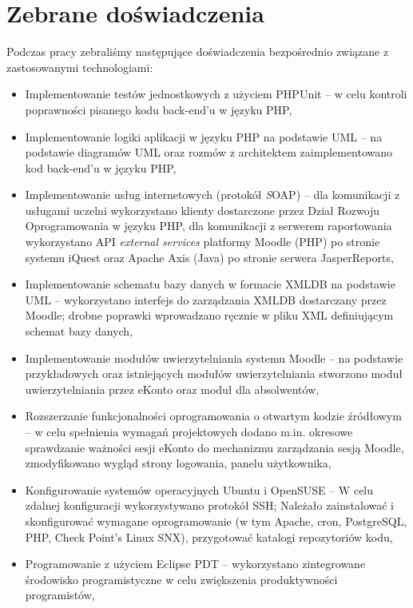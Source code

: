 \chapter{Zebrane doświadczenia}
\label{Chapter8}

Podczas pracy zebraliśmy następujące doświadczenia bezpośrednio związane z zastosowanymi technologiami:
\begin{itemize}
\item Implementowanie testów jednostkowych z użyciem PHPUnit -- w celu kontroli poprawności pisanego kodu back-end'u w języku PHP,
\item Implementowanie logiki aplikacji w języku PHP na podstawie UML -- na podstawie diagramów UML oraz rozmów z architektem zaimplementowano kod back-end'u w języku PHP,
\item Implementowanie usług internetowych (protokół \emph SOAP) -- dla komunikacji z usługami uczelni wykorzystano klienty dostarczone przez Dział Rozwoju Oprogramowania w języku PHP, dla komunikacji z serwerem raportowania wykorzystano API \emph{external services} platformy Moodle (PHP) po stronie systemu iQuest oraz Apache Axis (Java) po stronie serwera JasperReports,
\item Implementowanie schematu bazy danych w formacie XMLDB na podstawie UML -- wykorzystano interfejs do zarządzania XMLDB dostarczany przez Moodle; drobne poprawki wprowadzano ręcznie w pliku XML definiującym schemat bazy danych,
\item Implementowanie modułów uwierzytelniania systemu Moodle -- na podstawie przykładowych oraz istniejących modułów uwierzytelniania stworzono moduł uwierzytelniania przez eKonto oraz moduł dla absolwentów,
\item Rozszerzanie funkcjonalności oprogramowania o otwartym kodzie źródłowym -- w celu spełnienia wymagań projektowych dodano m.in. okresowe sprawdzanie ważności sesji eKonto do mechanizmu zarządzania sesją Moodle, zmodyfikowano wygląd strony logowania, panelu użytkownika,
\item Konfigurowanie systemów operacyjnych Ubuntu i OpenSUSE -- W celu zdalnej konfiguracji wykorzystywano protokół SSH; Należało zainstalować i skonfigurować wymagane oprogramowanie (w tym Apache, cron, PostgreSQL, PHP, Check Point's Linux SNX), przygotować katalogi repozytoriów kodu,
\item Programowanie z użyciem Eclipse PDT -- wykorzystano zintegrowane środowisko programistyczne w celu zwiększenia produktywności programistów,

\end{itemize}
